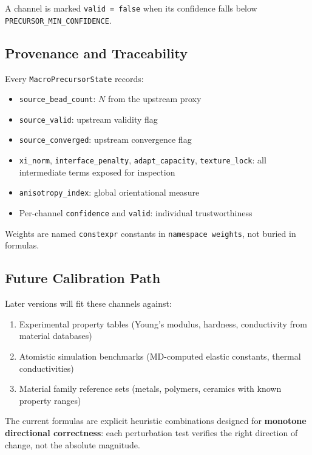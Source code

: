 \documentclass[11pt]{article}
\newcommand{\type}[1]{\texttt{#1}}
\begin{document}
A channel is marked \texttt{valid = false} when its confidence falls
below \texttt{PRECURSOR\_MIN\_CONFIDENCE}.

\subsection{Provenance and Traceability}

Every \type{MacroPrecursorState} records:
\begin{itemize}
  \item \texttt{source\_bead\_count}: $N$ from the upstream proxy
  \item \texttt{source\_valid}: upstream validity flag
  \item \texttt{source\_converged}: upstream convergence flag
  \item \texttt{xi\_norm}, \texttt{interface\_penalty},
        \texttt{adapt\_capacity}, \texttt{texture\_lock}: all
        intermediate terms exposed for inspection
  \item \texttt{anisotropy\_index}: global orientational measure
  \item Per-channel \texttt{confidence} and \texttt{valid}: individual
        trustworthiness
\end{itemize}

Weights are named \texttt{constexpr} constants in
\texttt{namespace weights}, not buried in formulas.

\subsection{Future Calibration Path}

Later versions will fit these channels against:
\begin{enumerate}
  \item Experimental property tables (Young's modulus, hardness,
        conductivity from material databases)
  \item Atomistic simulation benchmarks (MD-computed elastic
        constants, thermal conductivities)
  \item Material family reference sets (metals, polymers, ceramics
        with known property ranges)
\end{enumerate}

The current formulas are explicit heuristic combinations designed for
\textbf{monotone directional correctness}: each perturbation test
verifies the right direction of change, not the absolute magnitude.
\end{document}
